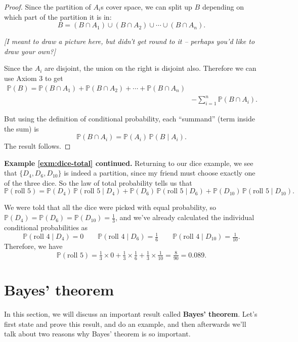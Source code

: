 \documentclass[
  a4paper,
]{book}
\theoremstyle{definition}
\theoremstyle{definition}
\theoremstyle{definition}
\theoremstyle{definition}
\theoremstyle{remark}
\begin{document}
\begin{proof}
Since the partition of \(A_i\)s cover space, we can split up \(B\) depending on which part of the partition it is in:
\[  B = (B \cap A_1) \cup (B \cap A_2) \cup \cdots \cup (B \cap A_n) .  \]

\emph{{[}I meant to draw a picture here, but didn't get round to it -- perhaps you'd like to draw your own?{]}}

Since the \(A_i\) are disjoint, the union on the right is disjoint also.
Therefore we can use Axiom 3 to get
\begin{align*} \mathbb P(B) = \mathbb P(B \cap A_1) + \mathbb P(B \cap A_2) + \cdots + \mathbb P(B \cap A_n)  \\
  &- \sum_{i=1}^n \mathbb P(B \cap A_i) .
\end{align*}

But using the definition of conditional probability, each ``summand'' (term inside the sum) is
\[ \mathbb P(B \cap A_i) = \mathbb P(A_i) \, \mathbb P(B \mid A_i) . \]
The result follows.
\end{proof}

\textbf{Example \ref{exm:dice-total} continued.} Returning to our dice example, we see that \(\{D_4, D_6, D_{10}\}\) is indeed a partition, since my friend must choose exactly one of the three dice. So the law of total probability tells us that
\[ \mathbb P(\text{roll 5}) = \mathbb P(D_4) \, \mathbb P(\text{roll 5} \mid D_4) +  \mathbb P(D_6) \, \mathbb P(\text{roll 5} \mid D_6) + \mathbb P(D_{10}) \, \mathbb P(\text{roll 5} \mid D_{10}) . \]

We were told that all the dice were picked with equal probability, so \(\mathbb P(D_4) = \mathbb P(D_6) = \mathbb P(D_{10}) = \frac13\), and we've already calculated the individual conditional probabilities as
\[ \mathbb P(\text{roll 4} \mid D_4) = 0 \qquad \mathbb P(\text{roll 4} \mid D_6) = \tfrac16 \qquad \mathbb P(\text{roll 4} \mid D_{10}) = \tfrac{1}{10} .  \]
Therefore, we have
\[ \mathbb P(\text{roll 5}) = \tfrac13\times 0 +  \tfrac13\times\tfrac16 +  \tfrac13\times\tfrac1{10} = \tfrac{8}{90} = 0.089. \]

\hypertarget{bayes}{%
\section{Bayes' theorem}\label{bayes}}

In this section, we will discuss an important result called \textbf{Bayes' theorem}.
Let's first state and prove this result, and do an example, and then afterwards we'll talk about two reasons why Bayes' theorem is so important.
\end{document}
